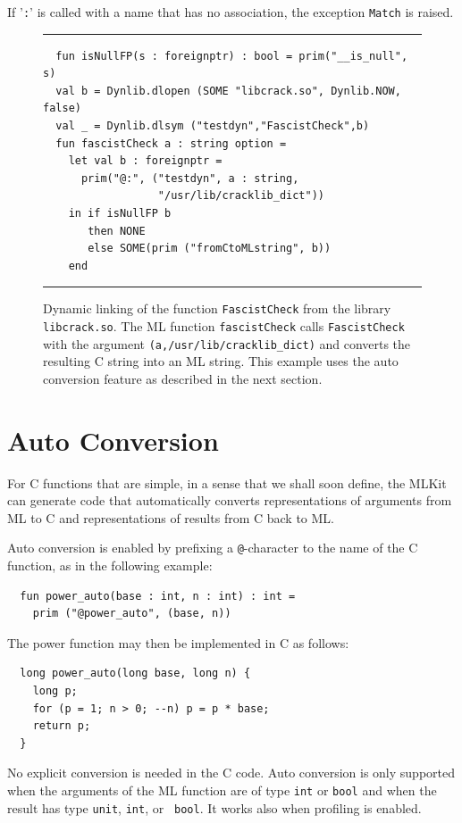 \documentclass[12pt]{book}
\begin{document}
If '\texttt{:}' is called with a name that has no association,
the exception \texttt{Match} is raised.
\begin{figure}
\hrule \medskip
\begin{verbatim}
  fun isNullFP(s : foreignptr) : bool = prim("__is_null", s)
  val b = Dynlib.dlopen (SOME "libcrack.so", Dynlib.NOW, false)
  val _ = Dynlib.dlsym ("testdyn","FascistCheck",b)
  fun fascistCheck a : string option =
    let val b : foreignptr =
      prim("@:", ("testdyn", a : string,
                  "/usr/lib/cracklib_dict"))
    in if isNullFP b
       then NONE
       else SOME(prim ("fromCtoMLstring", b))
    end
\end{verbatim}
\caption{Dynamic linking of the function \texttt{FascistCheck} from the library \texttt{libcrack.so}.
  The ML function \texttt{fascistCheck} calls \texttt{FascistCheck} with the argument
  \texttt{(a,/usr/lib/cracklib\_dict)} and converts the resulting C string into
  an ML string.
  This example uses the auto conversion feature as described in
  the next section.}
\label{dynlib.fig}
\medskip \hrule
\end{figure}

\section{Auto Conversion}
%
\label{auto_conversion.sec}
For C functions that are simple, in a sense
that we shall soon define, the MLKit can generate code that
automatically converts representations of arguments from ML to C and
representations of results from C back to ML.

Auto conversion is enabled by prefixing a {\tt @}-character to
the name of the C function, as in the following example:
\begin{verbatim}
  fun power_auto(base : int, n : int) : int =
    prim ("@power_auto", (base, n))
\end{verbatim}

\noindent
The power function may then be implemented in C as follows:
\begin{verbatim}
  long power_auto(long base, long n) {
    long p;
    for (p = 1; n > 0; --n) p = p * base;
    return p;
  }
\end{verbatim}

\noindent
No explicit conversion is needed in the C code. Auto conversion is only
supported when the arguments of the ML function are of type {\tt int} or
{\tt bool} and when the result has type {\tt unit}, {\tt int}, or {\tt
  bool}. It works also when profiling is enabled.
\end{document}
